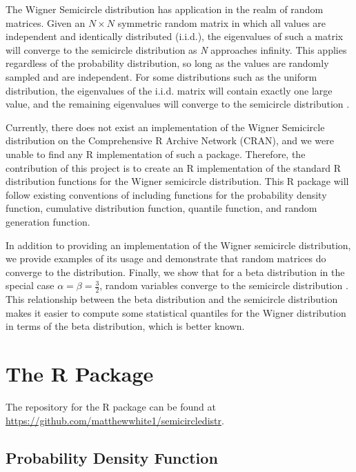 \documentclass[11pt]{asaproc}
\begin{document}
The Wigner Semicircle distribution has application in the realm of random
matrices. Given an $N \times N$ symmetric random matrix in which all values are independent and
identically distributed (i.i.d.), the eigenvalues of such a matrix will converge
to the semicircle distribution as \textit{N} approaches infinity. This applies
regardless of the probability distribution, so long as the values are randomly
sampled and are independent. For some distributions such as the uniform
distribution, the eigenvalues of the i.i.d. matrix will contain exactly one large
value, and the remaining eigenvalues will converge to the semicircle
distribution \citep{weisstein2025wigner}.

Currently, there does not exist an implementation of the Wigner Semicircle
distribution on the Comprehensive R Archive Network (CRAN), and we were unable to find any R implementation of such a
package. Therefore, the contribution of this project is to create an R
implementation of the standard R distribution functions for the Wigner
semicircle distribution. This R package will follow existing conventions of
including functions for the probability density function, cumulative
distribution function, quantile function, and random generation function.

In addition to providing an implementation of the Wigner semicircle
distribution, we provide examples of its usage and demonstrate that random
matrices do converge to the distribution. Finally, we show that for a beta
distribution in the special case $\alpha = \beta = \frac{3}{2}$, random
variables converge to the semicircle distribution \citep{wikimedia_wigner}. This relationship
between the beta distribution and the semicircle distribution makes it easier to
compute some statistical quantiles for the Wigner distribution in terms of the
beta distribution, which is better known.

\section{The R Package}
\label{Package}

The repository for the R package can be found at \url{https://github.com/matthewwhite1/semicircledistr}.

\subsection{Probability Density Function}
\end{document}
